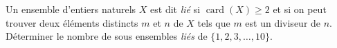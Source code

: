 \documentclass[varwidth]{standalone}
\begin{document}
    Un ensemble d'entiers naturels $X$ est dit \emph{li\'e} si $\operatorname{card}(X) \geq 2$ et si on peut trouver deux \'el\'ements distincts $m$ et $n$ de $X$ tels que $m$ est un diviseur de $n$. D\'eterminer le nombre de sous ensembles \emph{li\'es} de $\{1, 2, 3, \dots, 10\}$.
\end{document}
